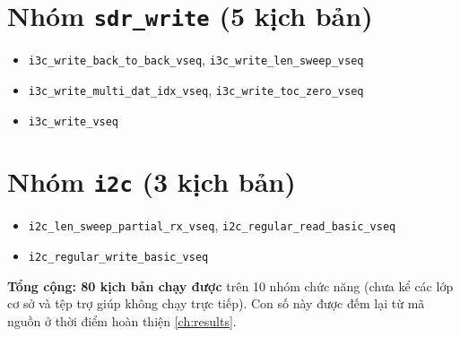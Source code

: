 \section*{Nhóm \texttt{sdr\_write} (5 kịch bản)}
\begin{itemize}\itemsep0pt
  \item \texttt{i3c\_write\_back\_to\_back\_vseq}, \texttt{i3c\_write\_len\_sweep\_vseq}
  \item \texttt{i3c\_write\_multi\_dat\_idx\_vseq}, \texttt{i3c\_write\_toc\_zero\_vseq}
  \item \texttt{i3c\_write\_vseq}
\end{itemize}

\section*{Nhóm \texttt{i2c} (3 kịch bản)}
\begin{itemize}\itemsep0pt
  \item \texttt{i2c\_len\_sweep\_partial\_rx\_vseq}, \texttt{i2c\_regular\_read\_basic\_vseq}
  \item \texttt{i2c\_regular\_write\_basic\_vseq}
\end{itemize}

\noindent \textbf{Tổng cộng: 80 kịch bản chạy được} trên 10 nhóm chức năng (chưa kể các lớp cơ sở và tệp
trợ giúp không chạy trực tiếp). Con số này được đếm lại từ mã nguồn ở thời điểm hoàn thiện \cref{ch:results}.
